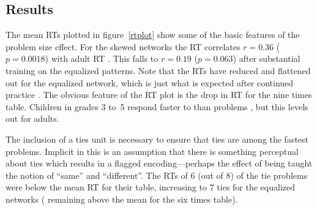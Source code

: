 \begin{figure}[bth]\centerline{}\end{figure}



\begin{figure}\centerline{}\end{figure}

\begin{figure}\centerline{}\end{figure}

\subsection*{Results}

The mean RTs plotted in figure~\ref{rtplot} show some
of the basic features of the problem size effect.  For the skewed networks
the RT correlates $r=0.36$ ($p=0.0018$) with adult RT \cite{camp85}. This
falls to $r=0.19$ ($p=0.063$) after substantial training on the equalized
patterns.  Note that the RTs have reduced and flattened out for the
equalized network, which is just what is expected after continued practice
\cite[p.~349]{camp85}. The obvious feature of the RT plot is the drop in RT
for the nine times table.  Children in grades 3 to~5 respond faster to 
than  problems \cite{camp85}, but this levels out for adults.

The inclusion of a ties unit is necessary to ensure that ties are among the
fastest problems.  Implicit in this is an assumption that there is
something perceptual about ties which results in a flagged
encoding---perhaps the effect of being taught the notion of ``same'' and
``different''. The RTs
of 6 (out of 8) of the tie problems were below the mean RT for their
table, increasing to 7 ties for the equalized networks ( remaining
above the mean for the six times table).

